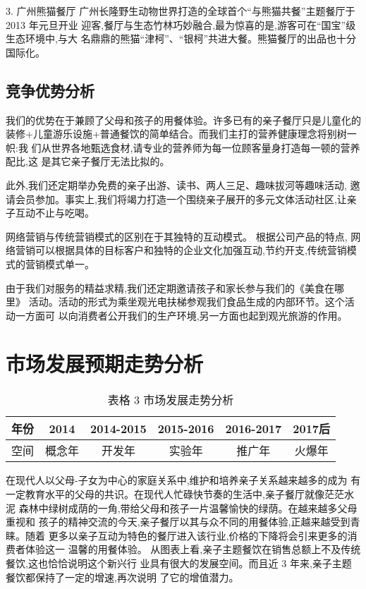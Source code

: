 3. 广州熊猫餐厅
广州长隆野生动物世界打造的全球首个“与熊猫共餐”主题餐厅于 2013 年元旦开业
迎客,餐厅与生态竹林巧妙融合,最为惊喜的是,游客可在“国宝”级生态环境中,与大
名鼎鼎的熊猫“津柯”、“银柯”共进大餐。熊猫餐厅的出品也十分国际化。

\subsection{竞争优势分析}
我们的优势在于兼顾了父母和孩子的用餐体验。许多已有的亲子餐厅只是儿童化的
装修+儿童游乐设施+普通餐饮的简单结合。而我们主打的营养健康理念将别树一帜:我
们从世界各地甄选食材,请专业的营养师为每一位顾客量身打造每一顿的营养配比,这
是其它亲子餐厅无法比拟的。

此外,我们还定期举办免费的亲子出游、读书、两人三足、趣味拔河等趣味活动,
邀请会员参加。事实上,我们将竭力打造一个围绕亲子展开的多元文体活动社区,让亲
子互动不止与吃喝。

网络营销与传统营销模式的区别在于其独特的互动模式。 根据公司产品的特点,
网络营销可以根据具体的目标客户和独特的企业文化加强互动,节约开支,传统营销模
式的营销模式单一。

由于我们对服务的精益求精,我们还定期邀请孩子和家长参与我们的《美食在哪里》
活动。活动的形式为乘坐观光电扶梯参观我们食品生成的内部环节。这个活动一方面可
以向消费者公开我们的生产环境,另一方面也起到观光旅游的作用。

\section{市场发展预期走势分析}
\begin{table}[htbp]
\caption{表格 3 市场发展走势分析}
\begin{tabular}{|c|c|c|c|c|c|}
\hline
年份&2014&2014-2015&2015-2016&2016-2017&2017后\\ \hline
空间&概念年&开发年&实验年&推广年&火爆年\\
\hline
\end{tabular}
\end{table}

在现代人以父母-子女为中心的家庭关系中,维护和培养亲子关系越来越多的成为
有一定教育水平的父母的共识。在现代人忙碌快节奏的生活中,亲子餐厅就像茫茫水泥
森林中绿树成荫的一角,带给父母和孩子一片温馨愉快的绿荫。在越来越多父母重视和
孩子的精神交流的今天,亲子餐厅以其与众不同的用餐体验,正越来越受到青睐。随着
更多以亲子互动为特色的餐厅进入该行业,价格的下降将会引来更多的消费者体验这一
温馨的用餐体验。
从图表上看,亲子主题餐饮在销售总额上不及传统餐饮,这也恰恰说明这个新兴行
业具有很大的发展空间。而且近 3 年来,亲子主题餐饮都保持了一定的增速,再次说明
了它的增值潜力。

